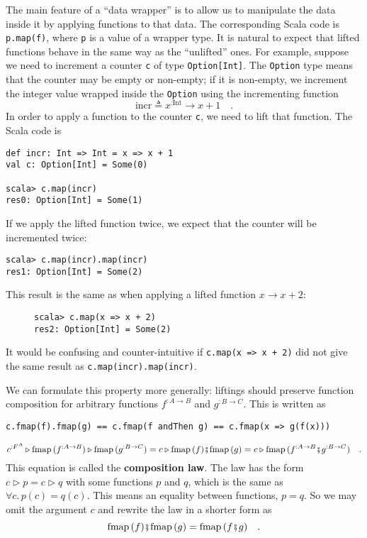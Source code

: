 The main feature of a \textsf{``}data wrapper\textsf{''} is to allow us to manipulate
the data inside it by applying functions to that data. The corresponding
Scala code is \lstinline!p.map(f)!, where \lstinline!p! is a value
of a wrapper type. It is natural to expect that lifted functions behave
in the same way as the \textsf{``}unlifted\textsf{''} ones. For example, suppose we
need to increment a counter \lstinline!c! of type \lstinline!Option[Int]!.
The \lstinline!Option! type means that the counter may be empty or
non-empty; if it is non-empty, we increment the integer value wrapped
inside the \lstinline!Option! using the incrementing function
\[
\text{incr}\triangleq x^{:\text{Int}}\rightarrow x+1\quad.
\]
In order to apply a function to the counter \lstinline!c!, we need
to lift that function. The Scala code is
\begin{lstlisting}
def incr: Int => Int = x => x + 1
val c: Option[Int] = Some(0)

scala> c.map(incr)
res0: Option[Int] = Some(1) 
\end{lstlisting}
If we apply the lifted function twice, we expect that the counter
will be incremented twice:
\begin{lstlisting}
scala> c.map(incr).map(incr)
res1: Option[Int] = Some(2)
\end{lstlisting}
This result is the same as when applying a lifted function $x\rightarrow x+2$:

\begin{wrapfigure}{l}{0.3\columnwidth}%
\vspace{-0.8\baselineskip}
\begin{lstlisting}
scala> c.map(x => x + 2)
res2: Option[Int] = Some(2)
\end{lstlisting}
\vspace{-1.2\baselineskip}
\end{wrapfigure}%

\noindent It would be confusing and counter-intuitive if \lstinline!c.map(x => x + 2)!
did not give the same result as \lstinline!c.map(incr).map(incr)!. 

We can formulate this property more generally: liftings should preserve
function composition for arbitrary functions $f^{:A\rightarrow B}$
and $g^{:B\rightarrow C}$. This is written as
\begin{lstlisting}
c.fmap(f).fmap(g) == c.fmap(f andThen g) == c.fmap(x => g(f(x))) 
\end{lstlisting}
\[
c^{:F^{A}}\triangleright\text{fmap}\,(f^{:A\rightarrow B})\triangleright\text{fmap}\,(g^{:B\rightarrow C})=c\triangleright\text{fmap}\,(f)\bef\text{fmap}\,(g)=c\triangleright\text{fmap}\,(f^{:A\rightarrow B}\bef g^{:B\rightarrow C})\quad.
\]
This equation is called the \textbf{composition law}.
The law has the form $c\triangleright p=c\triangleright q$ with some
functions $p$ and $q$, which is the same as $\forall c.\,p(c)=q(c)$.
This means an equality between functions, $p=q$. So we may omit the
argument $c$ and rewrite the law in a shorter form as 
\[
\text{fmap}\,(f)\bef\text{fmap}\,(g)=\text{fmap}\,(f\bef g)\quad.
\]

